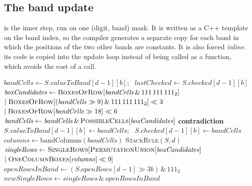 \documentclass[11pt]{article}
\theoremstyle{definition}
\theoremstyle{plain}
\let\origtextsc\textsc
\renewcommand{\textsc}[1]{\textup{\origtextsc{#1}}}
\begin{document}
\subsection{The band update}

 is the inner step, run on one (digit, band) mask. It is written as a C++ template on the band index, so the compiler generates a separate copy for each band in which
the positions of the two other bands are constants. It is also forced \emph{inline}: its code is copied into the update
loop instead of being called as a function, which avoids the cost of a call.

\begin{algorithm}[H]
\caption{\textsc{UpdateBand}$_b(S, d)$: band rule, stack rule and row singles for digit $d$ in band $b$}
\label{alg:band}
\begin{algorithmic}[1]
\State $\mathit{bandCells} \gets S.\mathit{valueToBand}[d-1][b]$; \ $\mathit{lastChecked} \gets S.\mathit{checked}[d-1][b]$
\State $\mathit{boxCandidates} \gets \textsc{BoxesOfRow}[\mathit{bandCells} \,\&\, 111\,111\,111_2]$
  \Statex \hspace{\algorithmicindent}\hspace{\algorithmicindent}$\mid \textsc{BoxesOfRow}[(\mathit{bandCells}\gg 9)\,\&\,111\,111\,111_2]\ll 3$
  \Statex \hspace{\algorithmicindent}\hspace{\algorithmicindent}$\mid \textsc{BoxesOfRow}[\mathit{bandCells}\gg 18]\ll 6$ 
\State $\mathit{bandCells} \gets \mathit{bandCells} \,\&\, \textsc{PossibleCells}[\mathit{boxCandidates}]$ 
 \Return \textbf{contradiction} \EndIf
\State $S.\mathit{valueToBand}[d-1][b] \gets \mathit{bandCells}$; \ $S.\mathit{checked}[d-1][b] \gets \mathit{bandCells}$
\State $\mathit{columns} \gets \mathrm{bandColumns}(\mathit{bandCells})$
 \textsc{StackRule}$(S, d)$ \EndIf
\State $\mathit{singleRows} \gets \textsc{SingleRows}[\textsc{PermutationUnion}[\mathit{boxCandidates}]$
  \Statex \hspace{\algorithmicindent}\hspace{\algorithmicindent}$\mid \textsc{OneColumnBoxes}[\mathit{columns}]\ll 9]$
\State $\mathit{openRowsInBand} \gets (S.\mathit{openRows}[d-1] \gg 3b) \,\&\, 111_2$ 
  \Statex \hspace{\algorithmicindent}$\mathit{newSingleRows} \gets \mathit{singleRows} \,\&\, \mathit{openRowsInBand}$

\end{algorithmic}
\end{algorithm}
\end{document}

